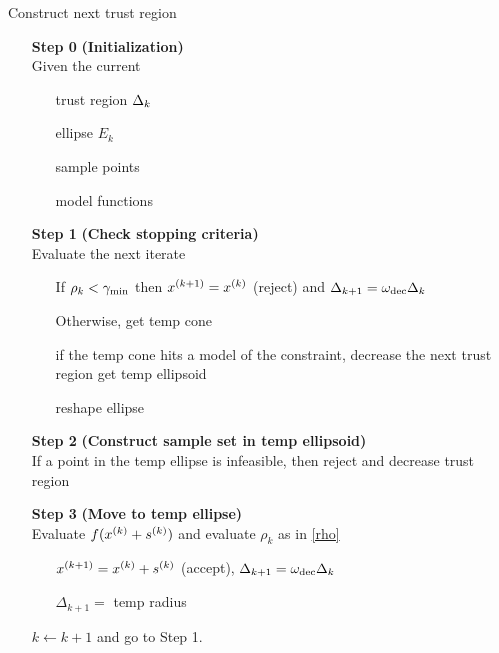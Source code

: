 \begin{algorithm}[H]
    \caption{Construct next trust region}
    \label{constrained_dfo}
    \begin{itemize}
        \item[\textbf{Step 0}] \textbf{(Initialization)} \\
            Given the current \begin{itemize}
                \item[] trust region $\Delta_k$
                \item[] ellipse $E_k$
                \item[] sample points
                \item[] model functions
            \end{itemize}
        
        \item[\textbf{Step 1}] \textbf{(Check stopping criteria)} \\
            Evaluate the next iterate \begin{itemize}
                \item[] If $\rho_k < \gamma_{\text{min}}$ then ${x}^{(k+1)}={x}^{(k)}$ (reject) and $\Delta_{k+1} = \omega_{\text{dec}}\Delta_{k}$
                \item[] Otherwise, get temp cone
                \item[] if the temp cone hits a model of the constraint, decrease the next trust region get temp ellipsoid    
                \item[] reshape ellipse
            \end{itemize}
        
        \item[\textbf{Step 2}] \textbf{(Construct sample set in temp ellipsoid)} \\
            If a point in the temp ellipse is infeasible, then reject and decrease trust region
            
        \item[\textbf{Step 3}] \textbf{(Move to temp ellipse)} \\
            Evaluate $f({x}^{(k)} + {{s}^{(k)}})$ and evaluate $\rho_k$ as in \cref{rho} \begin{itemize}
                \item[] ${x}^{(k+1)}={x}^{(k)}+{{s}^{(k)}}$ (accept), $\Delta_{k+1} = \omega_{\text{dec}}\Delta_{k}$
                \item[] $\Delta_{k+1} = $ temp radius
            \end{itemize}
            
            
        $k \gets k+1$ and go to Step 1.
    \end{itemize}
\end{algorithm}






